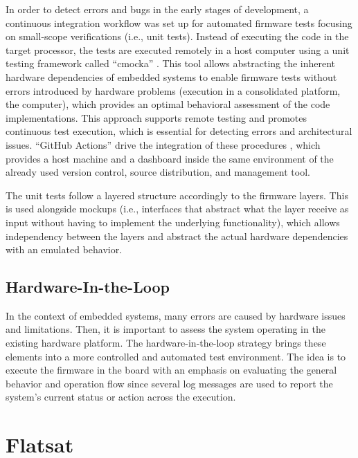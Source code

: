 In order to detect errors and bugs in the early stages of development, a continuous integration workflow was set up for automated firmware tests focusing on small-scope verifications (i.e., unit tests). Instead of executing the code in the target processor, the tests are executed remotely in a host computer using a unit testing framework called ``cmocka'' \cite{cmocka}. This tool allows abstracting the inherent hardware dependencies of embedded systems to enable firmware tests without errors introduced by hardware problems (execution in a consolidated platform, the computer), which provides an optimal behavioral assessment of the code implementations. This approach supports remote testing and promotes continuous test execution, which is essential for detecting errors and architectural issues. ``GitHub Actions'' drive the integration of these procedures \cite{gh-actions}, which provides a host machine and a dashboard inside the same environment of the already used version control, source distribution, and management tool.

The unit tests follow a layered structure accordingly to the firmware layers. This is used alongside mockups (i.e., interfaces that abstract what the layer receive as input without having to implement the underlying functionality), which allows independency between the layers and abstract the actual hardware dependencies with an emulated behavior.

\subsection{Hardware-In-the-Loop}

In the context of embedded systems, many errors are caused by hardware issues and limitations. Then, it is important to assess the system operating in the existing hardware platform. The hardware-in-the-loop strategy brings these elements into a more controlled and automated test environment. The idea is to execute the firmware in the board with an emphasis on evaluating the general behavior and operation flow since several log messages are used to report the system's current status or action across the execution.


\section{Flatsat}

